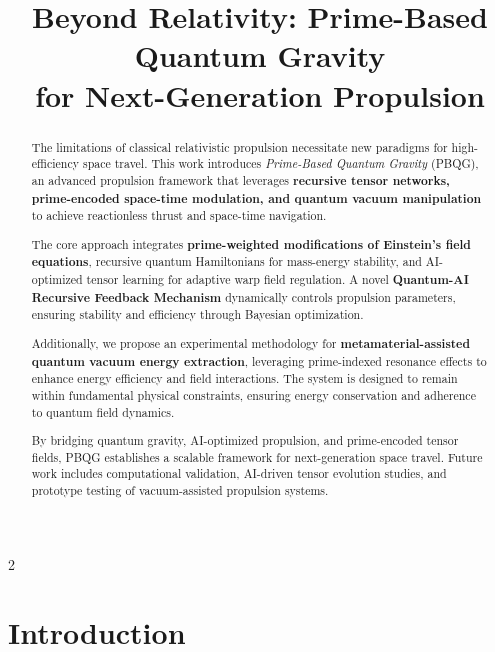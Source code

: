 \documentclass{article}
\theoremstyle{plain}
\begin{document}
\title{Beyond Relativity: Prime-Based Quantum Gravity \\ for Next-Generation Propulsion}
\author{}
\maketitle
\nolinenumbers
\begin{abstract}
The limitations of classical relativistic propulsion necessitate new paradigms for high-efficiency space travel. This work introduces \textit{Prime-Based Quantum Gravity} (PBQG), an advanced propulsion framework that leverages \textbf{recursive tensor networks, prime-encoded space-time modulation, and quantum vacuum manipulation} to achieve reactionless thrust and space-time navigation.

The core approach integrates \textbf{prime-weighted modifications of Einstein’s field equations}, recursive quantum Hamiltonians for mass-energy stability, and AI-optimized tensor learning for adaptive warp field regulation. A novel \textbf{Quantum-AI Recursive Feedback Mechanism} dynamically controls propulsion parameters, ensuring stability and efficiency through Bayesian optimization.

Additionally, we propose an experimental methodology for \textbf{metamaterial-assisted quantum vacuum energy extraction}, leveraging prime-indexed resonance effects to enhance energy efficiency and field interactions. The system is designed to remain within fundamental physical constraints, ensuring energy conservation and adherence to quantum field dynamics.

By bridging quantum gravity, AI-optimized propulsion, and prime-encoded tensor fields, PBQG establishes a scalable framework for next-generation space travel. Future work includes computational validation, AI-driven tensor evolution studies, and prototype testing of vacuum-assisted propulsion systems.

\end{abstract}
\newpage
 \begin{multicols}{2}
\begin{singlespace}
\tableofcontents
\end{singlespace}
\end{multicols}

\linenumbers
\section{Introduction}
\label{sec:introduction}
\end{document}
